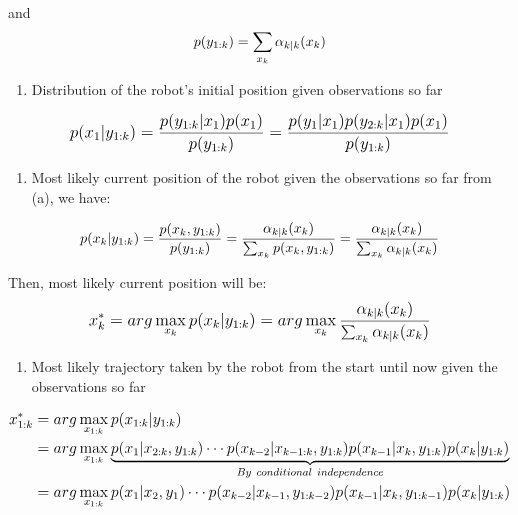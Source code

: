 \documentclass[11pt]{article}
\providecommand{\tightlist}{%
      \setlength{\itemsep}{0pt}\setlength{\parskip}{0pt}}
\begin{document}
and \[
\large p(y_{1:k}) = \sum_{x_k}\alpha_{k|k}(x_k)
\]

    \begin{enumerate}
\def\labelenumi{(\alph{enumi})}
\setcounter{enumi}{4}
\tightlist
\item
  Distribution of the robot's initial position given observations so far
\end{enumerate}

\[\large
\begin{align*}
p(x_1|y_{1:k}) &= \frac{p(y_{1:k}|x_1)p(x_1)}{p(y_{1:k})} = \frac{p(y_1|x_1)p(y_{2:k}|x_1)p(x_1)}{p(y_{1:k})}\\
\end{align*}
\]

    \begin{enumerate}
\def\labelenumi{(\alph{enumi})}
\setcounter{enumi}{5}
\tightlist
\item
  Most likely current position of the robot given the observations so
  far from (a), we have:
\end{enumerate}

\[\large p(x_k | y_{1:k}) = \frac{p(x_k,  y_{1:k})}{p(y_{1:k})} = \frac{\alpha_{k|k}(x_k)}{\sum_{x_k}p(x_k, y_{1:k})} = \frac{\alpha_{k|k}(x_k)}{\sum_{x_k}\alpha_{k|k}(x_k)}\]

Then, most likely current position will be: \[\large
\begin{align*}
x_k^* = arg \max_{x_k}p(x_k|y_{1:k}) = arg \max_{x_k}\frac{\alpha_{k|k}(x_k)}{\sum_{x_k}\alpha_{k|k}(x_k)}
\end{align*}
\]

    \begin{enumerate}
\def\labelenumi{(\alph{enumi})}
\setcounter{enumi}{6}
\tightlist
\item
  Most likely trajectory taken by the robot from the start until now
  given the observations so far
\end{enumerate}

\[\large
\begin{align*}
x_{1:k}^* &= arg \max_{x_{1:k}}p(x_{1:k}|y_{1:k}) \\
&= arg \max_{x_{1:k}} \underbrace{ p(x_{1}|x_{2:k}, y_{1:k}) \cdots p(x_{k-2}|x_{k-1:k}, y_{1:k}) p(x_{k-1}|x_k, y_{1:k}) p(x_{k}|y_{1:k})}_{By\  conditional\  independence} \\
& = arg \max_{x_{1:k}} p(x_{1}|x_{2}, y_{1}) \cdots p(x_{k-2}|x_{k-1}, y_{1:k-2}) p(x_{k-1}|x_k, y_{1:k-1}) p(x_{k}|y_{1:k}) 
\end{align*}
\]
\end{document}

